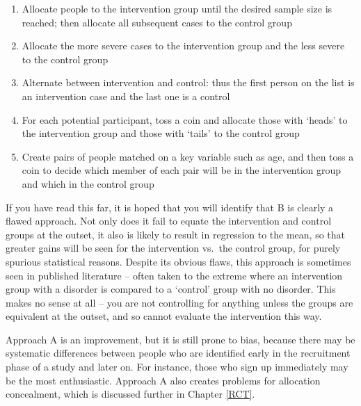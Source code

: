 \documentclass{krantz}
\providecommand{\tightlist}{%
\setlength{\itemsep}{0pt}\setlength{\parskip}{0pt}}
\begin{document}
\begin{enumerate}
\def\labelenumi{\Alph{enumi}.}
\tightlist
\item
  Allocate people to the intervention group until the desired sample size is reached; then allocate all subsequent cases to the control group~
\item
  Allocate the more severe cases to the intervention group and the less severe to the control group\\
\item
  Alternate between intervention and control: thus the first person on the list is an intervention case and the last one is a control\\
\item
  For each potential participant, toss a coin and allocate those with `heads' to the intervention group and those with `tails' to the control group\\
\item
  Create pairs of people matched on a key variable such as age, and then toss a coin to decide which member of each pair will be in the intervention group and which in the control group
\end{enumerate}

If you have read this far, it is hoped that you will identify that B is clearly a flawed approach. Not only does it fail to equate the intervention and control groups at the outset, it also is likely to result in regression to the mean, so that greater gains will be seen for the intervention vs.~the control group, for purely spurious statistical reasons. Despite its obvious flaws, this approach is sometimes seen in published literature -- often taken to the extreme where an intervention group with a disorder is compared to a `control' group with no disorder. This makes no sense at all -- you are not controlling for anything unless the groups are equivalent at the outset, and so cannot evaluate the intervention this way.

Approach A is an improvement, but it is still prone to bias, because there may be systematic differences between people who are identified early in the recruitment phase of a study and later on. For instance, those who sign up immediately may be the most enthusiastic. Approach A also creates problems for allocation concealment, which is discussed further in Chapter \ref{RCT}.
\end{document}
